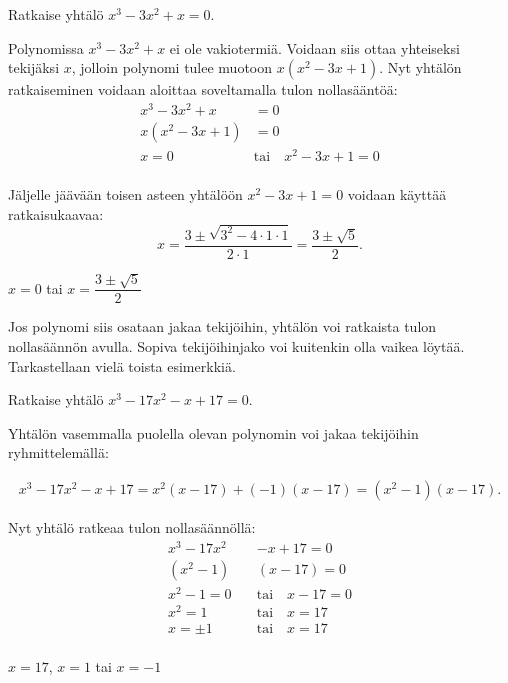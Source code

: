 
\begin{esimerkki}
Ratkaise yhtälö $x^3 - 3x^2 + x = 0$.
\begin{esimratk}
Polynomissa $x^3 - 3x^2 + x$ ei ole vakiotermiä. Voidaan siis ottaa yhteiseksi tekijäksi $x$, jolloin polynomi tulee muotoon $x(x^2 - 3x + 1)$. Nyt yhtälön ratkaiseminen voidaan aloittaa soveltamalla tulon nollasääntöä:
\begin{align*}
x^3 - 3x^2 + x & =0 \\
x(x^2 - 3x + 1) & =0 \\
x=0 \quad & \text{tai} \quad x^2 - 3x + 1 = 0 \\
\end{align*}

Jäljelle jäävään toisen asteen yhtälöön $x^2 - 3x + 1 = 0$ voidaan käyttää ratkaisukaavaa:
\[
x =\frac{3\pm\sqrt{3^2-4\cdot 1\cdot 1}}{2\cdot 1}=\frac{3\pm \sqrt{5}}{2}.
\]
\end{esimratk}
\begin{esimvast} $x=0$ tai $x=\dfrac{3\pm \sqrt{5}}{2}$
\end{esimvast}
\end{esimerkki}

Jos polynomi siis osataan jakaa tekijöihin, yhtälön voi ratkaista tulon nollasäännön avulla. Sopiva tekijöihinjako voi kuitenkin olla vaikea löytää. Tarkastellaan vielä toista esimerkkiä.

\begin{esimerkki}
Ratkaise yhtälö $x^3-17x^2-x+17 = 0$.

\begin{esimratk}
Yhtälön vasemmalla puolella olevan polynomin voi jakaa tekijöihin ryhmittelemällä:

\begin{align*}
x^3-17x^2-x+17=x^2(x-17)+(-1)(x-17)=(x^2-1)(x-17).
\end{align*}

Nyt yhtälö ratkeaa tulon nollasäännöllä:
\begin{align*}
x^3-17x^2&-x+17=0 \\
(x^2-1)&(x-17)=0 \\
x^2-1 = 0 \quad &\text{tai} \quad x - 17 = 0 \\
x^2 = 1 \quad &\text{tai} \quad x = 17 \\
x =\pm 1 \quad &\text{tai} \quad x = 17 \\
\end{align*}
\end{esimratk}

\begin{esimvast}
$x = 17$, $x = 1$ tai $x=-1$
\end{esimvast}
\end{esimerkki}

